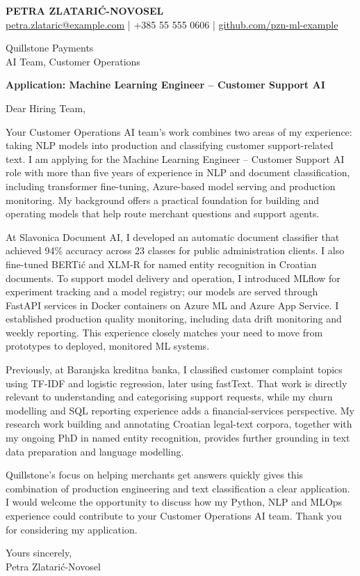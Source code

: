 \documentclass[11pt,a4paper]{article}
\begin{document}
{\Large\bfseries\color{primarycolor} PETRA ZLATARIĆ-NOVOSEL}\\[0.4em]
{\small\href{mailto:petra.zlataric@example.com}{petra.zlataric@example.com} | +385 55 555 0606 | \href{https://github.com/pzn-ml-example}{github.com/pzn-ml-example}}

Quillstone Payments\\
AI Team, Customer Operations

\textbf{Application: Machine Learning Engineer -- Customer Support AI}

Dear Hiring Team,

Your Customer Operations AI team's work combines two areas of my experience: taking NLP models into production and classifying customer support-related text. I am applying for the Machine Learning Engineer -- Customer Support AI role with more than five years of experience in NLP and document classification, including transformer fine-tuning, Azure-based model serving and production monitoring. My background offers a practical foundation for building and operating models that help route merchant questions and support agents.

At Slavonica Document AI, I developed an automatic document classifier that achieved 94\% accuracy across 23 classes for public administration clients. I also fine-tuned BERTić and XLM-R for named entity recognition in Croatian documents. To support model delivery and operation, I introduced MLflow for experiment tracking and a model registry; our models are served through FastAPI services in Docker containers on Azure ML and Azure App Service. I established production quality monitoring, including data drift monitoring and weekly reporting. This experience closely matches your need to move from prototypes to deployed, monitored ML systems.

Previously, at Baranjska kreditna banka, I classified customer complaint topics using TF-IDF and logistic regression, later using fastText. That work is directly relevant to understanding and categorising support requests, while my churn modelling and SQL reporting experience adds a financial-services perspective. My research work building and annotating Croatian legal-text corpora, together with my ongoing PhD in named entity recognition, provides further grounding in text data preparation and language modelling.

Quillstone's focus on helping merchants get answers quickly gives this combination of production engineering and text classification a clear application. I would welcome the opportunity to discuss how my Python, NLP and MLOps experience could contribute to your Customer Operations AI team. Thank you for considering my application.

Yours sincerely,\\
Petra Zlatarić-Novosel
\end{document}
